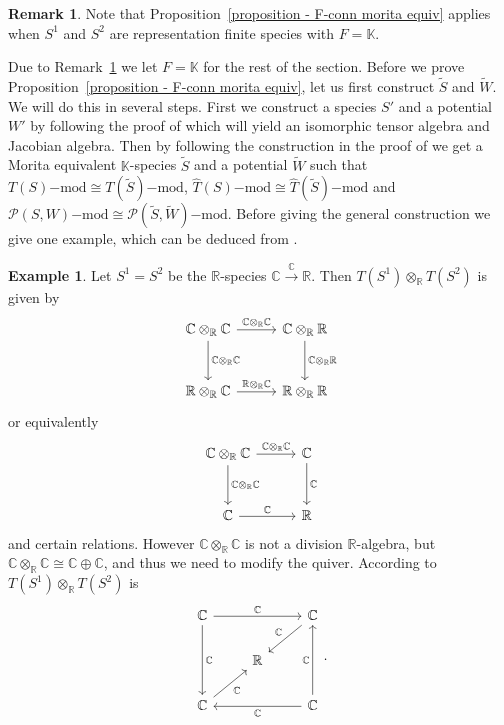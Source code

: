 \documentclass[a4paper, reqno]{amsart}
\theoremstyle{definition}
\newtheorem{myrem}[mythm]{Remark}
\newtheorem{myex}[mythm]{Example}
\newcommand{\C}{\mathbb{C}}
\newcommand{\K}{\mathbb{K}}
\newcommand{\R}{\mathbb{R}}
\begin{document}
\begin{myrem}\label{remark - F = K}
	Note that Proposition~\ref{proposition - F-conn morita equiv} applies when $S^1$ and $S^2$ are representation finite species with $F = \K$.
\end{myrem}

Due to Remark~\ref{remark - F = K} we let $F = \K$ for the rest of the section. Before we prove Proposition~\ref{proposition - F-conn morita equiv}, let us first construct $\tilde{S}$ and $\tilde{W}$. We will do this in several steps. First we construct a species $S'$ and a potential $W'$ by following the proof of \cite[Lemma 3.4]{soderberg2024mutation} which will yield an isomorphic tensor algebra and Jacobian algebra. Then by following the construction in the proof of \cite[Lemma 3.24]{soderberg2024mutation} we get a Morita equivalent $\K$-species $\tilde{S}$ and a potential $\tilde{W}$ such that $T(S)\mathrm{-mod}\cong T(\tilde{S})\mathrm{-mod}$, $\widehat{T}(S)\mathrm{-mod}\cong \widehat{T}(\tilde{S})\mathrm{-mod}$ and $\mathcal{P}(S, W)\mathrm{-mod}\cong \mathcal{P}(\tilde{S}, \tilde{W})\mathrm{-mod}$. Before giving the general construction we give one example, which can be deduced from \cite{soderberg2024mutation}.

\begin{myex}\label{example - modify quiver}
	Let $S^1 = S^2$ be the $\R$-species $\C \xrightarrow{\C} \R$. Then $T(S^1)\otimes_\R T(S^2)$ is given by
	\begin{equation*}
		\begin{tikzcd}[column sep=1cm, row sep=1cm]
			\C\otimes_\R \C \ar[r, "\C\otimes_\R \C"] \ar[d, "\C\otimes_\R \C"] & \C\otimes_\R \R \ar[d, "\C\otimes_\R \R"] \\
			\R \otimes_\R \C \ar[r, "\R \otimes_\R \C"] & \R\otimes_\R \R
		\end{tikzcd}
	\end{equation*}
	or equivalently
	\begin{equation*}
		\begin{tikzcd}[column sep=1cm, row sep=1cm]
			\C\otimes_\R \C \ar[r, "\C\otimes_\R \C"] \ar[d, "\C\otimes_\R \C"] & \C \ar[d, "\C"] \\
			\C \ar[r, "\C"] & \R
		\end{tikzcd}
	\end{equation*}
	and certain relations. However $\C\otimes_\R \C$ is not a division $\R$-algebra, but $\C\otimes_\R \C \cong \C\oplus \C$, and thus we need to modify the quiver. According to \cite[Table 1]{soderberg2024mutation} $T(S^1)\otimes_\R T(S^2)$ is
	\begin{equation*}
		\begin{tikzcd}
			\C \arrow[rr, "\C"] \arrow[dd, "\C"] & & \C \arrow[dl, swap, "\C"] \\
			& \R \\
			\C \arrow[ur, swap, "\C"] & & \C \arrow[ll, "\C"] \arrow[uu, "\C"]
		\end{tikzcd}.
	\end{equation*}
\end{myex}
\end{document}
